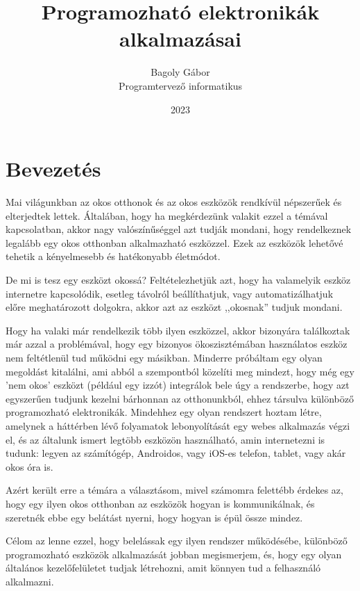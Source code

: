 \documentclass[
]{thesis-ekf}
\theoremstyle{definition}
\theoremstyle{remark}
\begin{document}
	\title{Programozható elektronikák alkalmazásai}
	\author{Bagoly Gábor\\Programtervező informatikus}
	\date{2023}
	\maketitle
	\tableofcontents
	
	\chapter*{Bevezetés}
	
	Mai világunkban az okos otthonok és az okos eszközök rendkívül népszerűek és elterjedtek lettek. Általában, hogy ha megkérdezünk valakit ezzel a témával kapcsolatban, akkor nagy valószínűséggel azt tudják mondani, hogy rendelkeznek legalább egy okos otthonban alkalmazható eszközzel. Ezek az eszközök lehetővé tehetik a kényelmesebb és hatékonyabb életmódot. 
	
	De mi is tesz egy eszközt okossá? Feltételezhetjük azt, hogy ha valamelyik eszköz internetre kapcsolódik, esetleg távolról beállíthatjuk, vagy automatizálhatjuk előre meghatározott dolgokra, akkor azt az eszközt ,,okosnak'' tudjuk mondani.
	
	Hogy ha valaki már rendelkezik több ilyen eszközzel, akkor bizonyára találkoztak már azzal a problémával, hogy egy bizonyos ökoszisztémában használatos eszköz nem feltétlenül tud működni egy másikban. Minderre próbáltam egy olyan megoldást kitalálni, ami abból a szempontból közelíti meg mindezt, hogy még egy 'nem okos' eszközt (például egy izzót) integrálok bele úgy a rendszerbe, hogy azt egyszerűen tudjunk kezelni bárhonnan az otthonunkból, ehhez társulva különböző programozható elektronikák. Mindehhez egy olyan rendszert hoztam létre, amelynek a háttérben lévő folyamatok lebonyolítását egy webes alkalmazás végzi el, és az általunk ismert legtöbb eszközön használható, amin internetezni is tudunk: legyen az számítógép, Androidos, vagy iOS-es telefon, tablet, vagy akár okos óra is.
	
	Azért került erre a témára a választásom, mivel számomra felettébb érdekes az, hogy egy ilyen okos otthonban az eszközök hogyan is kommunikálnak, és szeretnék ebbe egy belátást nyerni, hogy hogyan is épül össze mindez.

	Célom az lenne ezzel, hogy belelássak egy ilyen rendszer működésébe, különböző programozható eszközök alkalmazását jobban megismerjem, és, hogy egy olyan általános kezelőfelületet tudjak létrehozni, amit könnyen tud a felhasználó alkalmazni.
	
\end{document}
